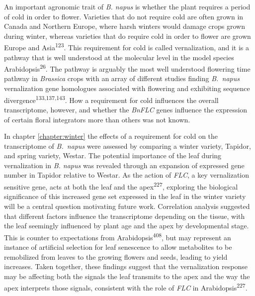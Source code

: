 \documentclass[12pt,]{book}
\begin{document}
An important agronomic trait of \emph{B. napus} is whether the plant
requires a period of cold in order to flower. Varieties that do not
require cold are often grown in Canada and Northern Europe, where harsh
winters would damage crops grown during winter, whereas varieties that
do require cold in order to flower are grown Europe and
Asia\textsuperscript{123}. This requirement for cold is called
vernalization, and it is a pathway that is well understood at the
molecular level in the model species Arabidopsis\textsuperscript{26}.
The pathway is arguably the most well understood flowering time pathway
in \emph{Brassica} crops with an array of different studies finding
\emph{B.~napus} vernalization gene homologues associated with flowering
and exhibiting sequence divergence\textsuperscript{133,137,143}. How a
requirement for cold influences the overall transcriptome, however, and
whether the \emph{BnFLC} genes influence the expression of certain
floral integrators more than others was not known.

In chapter \ref{chapter:winter} the effects of a requirement for cold on
the transcriptome of \emph{B.~napus} were assessed by comparing a winter
variety, Tapidor, and spring variety, Westar. The potential importance
of the leaf during vernalization in \emph{B. napus} was revealed through
an expansion of expressed gene number in Tapidor relative to Westar. As
the action of \emph{FLC}, a key vernalization sensitive gene, acts at
both the leaf and the apex\textsuperscript{227}, exploring the
biological significance of this increased gene set expressed in the leaf
in the winter variety will be a central question motivating future work.
Correlation analysis suggested that different factors influence the
transcriptome depending on the tissue, with the leaf seemingly
influenced by plant age and the apex by developmental stage. This is
counter to expectations from Arabidopsis\textsuperscript{408}, but may
represent an instance of artificial selection for leaf senescence to
allow metabolites to be remobilized from leaves to the growing flowers
and seeds, leading to yield increases. Taken together, these findings
suggest that the vernalization response may be affecting both the
signals the leaf transmits to the apex and the way the apex interprets
those signals, consistent with the role of \emph{FLC} in
Arabidopsis\textsuperscript{227}.
\end{document}
